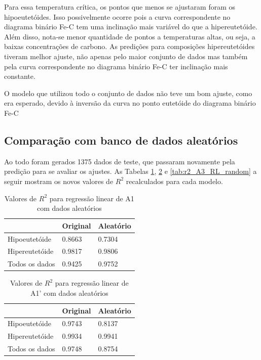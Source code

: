 \documentclass[brazil,tf,epusp]{usp}  %
\begin{document}
Para essa temperatura crítica, os pontos que menos se ajustaram foram os hipoeutetóides. Isso possivelmente ocorre pois a curva correspondente no diagrama binário Fe-C tem uma inclinação mais variável do que a hipereutetóide. Além disso, nota-se menor quantidade de pontos a temperaturas altas, ou seja, a baixas concentrações de carbono. As predições para composições hipereutetóides tiveram melhor ajuste, não apenas pelo maior conjunto de dados mas também pela curva correspondente no diagrama binário Fe-C ter inclinação mais constante.

O modelo que utilizou todo o conjunto de dados não teve um bom ajuste, como era esperado, devido à inversão da curva no ponto eutetóide do diagrama binário Fe-C

\subsection{Comparação com banco de dados aleatórios}
Ao todo foram gerados 1375 dados de teste, que passaram novamente pela predição para se avaliar os ajustes. As Tabelas \ref{tab:r2_A1_RL_random}, \ref{tab:r2_A1prime_RL_random} e \ref{tab:r2_A3_RL_random} a seguir mostram os novos valores de $R^{2}$ recalculados para cada modelo.

\begin{table}
  \caption{Valores de $R^{2}$ para regressão linear de A1 com dados aleatórios}

  \begin{tabular}{lll}
  \hline
                 & Original & Aleatório \\
  \hline
  Hipoeutetóide  & 0.8663   & 0.7304    \\
  Hipereutetóide & 0.9817   & 0.9806    \\
  Todos os dados & 0.9425   & 0.9752    \\
  \hline
  \end{tabular}

  \label{tab:r2_A1_RL_random}
\end{table}

\begin{table}
  \caption{Valores de $R^{2}$ para regressão linear de A1' com dados aleatórios}

  \begin{tabular}{lll}
  \hline
                 & Original & Aleatório \\
  \hline
  Hipoeutetóide  & 0.9743   & 0.8137    \\
  Hipereutetóide & 0.9934   & 0.9941    \\
  Todos os dados & 0.9748   & 0.8754    \\
  \hline
  \end{tabular}

  \label{tab:r2_A1prime_RL_random}
\end{table}
\end{document}
